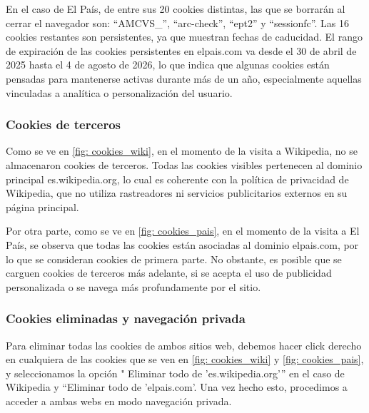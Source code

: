 En el caso de El País, de entre sus 20 cookies distintas, las que se borrarán al cerrar el navegador son: “AMCVS_”, “arc-check”, “ept2” y “sessionfc”. Las 16 cookies restantes son persistentes, ya que muestran fechas de caducidad. El rango de expiración de las cookies persistentes en elpais.com va desde el 30 de abril de 2025 hasta el 4 de agosto de 2026, lo que indica que algunas cookies están pensadas para mantenerse activas durante más de un año, especialmente aquellas vinculadas a analítica o personalización del usuario. 

\subsubsection{Cookies de terceros}

Como se ve en \ref{fig: cookies_wiki}, en el momento de la visita a Wikipedia, no se almacenaron cookies de terceros. Todas las cookies visibles pertenecen al dominio principal es.wikipedia.org, lo cual es coherente con la política de privacidad de Wikipedia, que no utiliza rastreadores ni servicios publicitarios externos en su página principal. 

Por otra parte, como se ve en \ref{fig: cookies_pais}, en el momento de la visita a El País, se observa que todas las cookies están asociadas al dominio elpais.com, por lo que se consideran cookies de primera parte. No obstante, es posible que se carguen cookies de terceros más adelante, si se acepta el uso de publicidad personalizada o se navega más profundamente por el sitio.

\subsubsection{Cookies eliminadas y navegación privada}

Para eliminar todas las cookies de ambos sitios web, debemos hacer click derecho en cualquiera de las cookies que se ven en \ref{fig: cookies_wiki} y \ref{fig: cookies_pais}, y seleccionamos la opción " Eliminar todo de 'es.wikipedia.org'” en el caso de Wikipedia y “Eliminar todo de 'elpais.com'. Una vez hecho esto, procedimos a acceder a ambas webs en modo navegación privada. 

